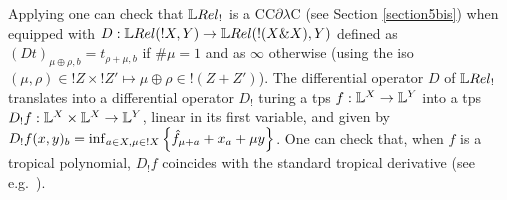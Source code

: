 Applying \cite[Theorem 6.1]{lemay2020} one can check that
 $\LREL_!$ is a CC$\partial\lambda$C (see Section \ref{section5bis}) when equipped with $D:\HOM{\LREL}{!X}{Y}\to \HOM{\LREL}{!(X\& X)}{Y}$ defined as $(Dt)_{\mu\oplus\rho,b}=t_{\rho+\mu,b}$ if $\#\mu=1$ and as $\infty$ otherwise (using the iso $(\mu,\rho)\in !Z\times !Z'\mapsto\mu\oplus\rho \in !(Z+Z')$).
 The differential operator $D$ of $\LREL_{!}$ translates into a differential operator $D_{!}$ turing a tps $f:\mathbb{L}^{X}\to \mathbb{L}^{Y}$ into a tps $D_{!}f:\mathbb{L}^{X}\times \mathbb{L}^{X}\to \mathbb{L}^{Y}$, linear in its first variable, and given by 
$D_{!}f(x,y)_{b}=\inf_{a\in X, \mu\in !X}\left\{\hat{f}_{\mu+a}+x_{a}+\mu y\right\}$. One can check that, when $f$ is a tropical polynomial, $D_{!}f$ coincides with the standard tropical derivative (see e.g.~\cite{Grigoriev2017}).

\begin{comment}
Writing $\Der^2[\_,(\_)^2]$ as a shortcut for $\Der[\Der[\_,\_],\_]$ and $\Der^1[\_,(\_)^1]$ for $\Diff{\_}{\_}$, the analogue of the previous $\BSTLC$-term is $\vdash_{\STDLC} \lambda {\color{red}z}. \Der^{\color{red}2}[
	\lambda x{\color{green}y}.
		\Der^{\color{violet}1} [
				\Der^{\color{blue}1} [y, x^{\color{blue}1}]
        0, x^{\color{violet}1}
	]0
, z^{\color{red}2}]0
: {\color{red}*}\to ({\color{green}* \to * \to *}) \to *$.
In particular, if the \emph{multiplicities} of the arguments (the colored exponents) do not exactly match the number of duplications, e.g.\ in $\vdash_{\STDLC} \lambda z. \Der^{\color{red}3}[
	\lambda xy.
		\Diff{
				\Diff{y}{x}
		0}{x}
	0
, z^{\color{red}3}]0
: *\to (* \to * \to *) \to *$, then the term reduces to the empty sum $0$ (representing an \emph{error}).
\end{comment}

